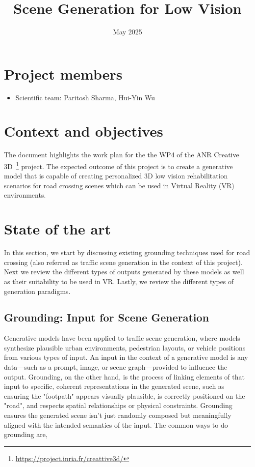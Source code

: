 \documentclass{article}
\title{Scene Generation for Low Vision}
\date{May 2025}
\begin{document}
\maketitle

\section*{Project members}

\begin{itemize}
    \item Scientific team: Paritosh Sharma, Hui-Yin Wu
\end{itemize}

\section{Context and objectives}

The document highlights the work plan for the the WP4 of the ANR Creative 3D~\footnote{\url{https://project.inria.fr/creattive3d/}} project. The expected outcome of this project is to create a generative model that is capable of creating personalized 3D low vision rehabilitation scenarios for road crossing scenes which can be used in Virtual Reality (VR) environments.

\section{State of the art}

In this section, we start by discussing existing grounding techniques used for road crossing (also referred as traffic scene generation in the context of this project). Next we review the different types of outputs generated by these models as well as their suitability to be used in VR. Lastly, we review the different types of generation paradigms.

\subsection{Grounding: Input for Scene Generation}

Generative models have been applied to traffic scene generation, where models synthesize plausible urban environments, pedestrian layouts, or vehicle positions from various types of input. An input in the context of a generative model is any data—such as a prompt, image, or scene graph—provided to influence the output. Grounding, on the other hand, is the process of linking elements of that input to specific, coherent representations in the generated scene, such as ensuring the "footpath" appears visually plausible, is correctly positioned on the "road", and respects spatial relationships or physical constraints. Grounding ensures the generated scene isn't just randomly composed but meaningfully aligned with the intended semantics of the input. The common ways to do grounding are,
\end{document}
